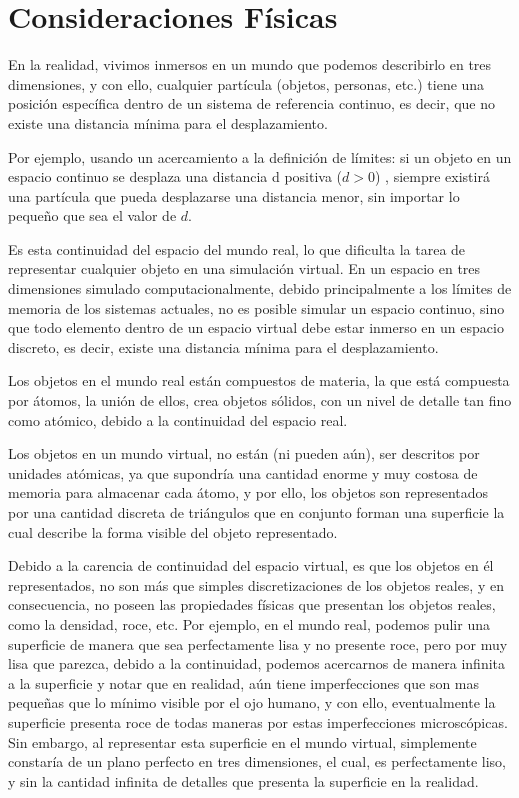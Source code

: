 \section{Consideraciones Físicas}
\label{sec:consideracionesFisicas}
En la realidad, vivimos inmersos en un mundo que podemos describirlo en tres
dimensiones, y con ello, cualquier partícula (objetos, personas, etc.) tiene una posición
específica dentro de un sistema de referencia continuo, es decir, que no existe una distancia
mínima para el desplazamiento.

Por ejemplo, usando un acercamiento a la definición de límites: si un objeto en un espacio
continuo se desplaza una distancia  d  positiva  ($d > 0$) , siempre existirá una partícula que
pueda desplazarse una distancia menor, sin importar lo pequeño que sea el valor de $d$.

Es esta continuidad del espacio del mundo real, lo que dificulta la tarea de representar
cualquier objeto en una simulación virtual.
En un espacio en tres dimensiones simulado computacionalmente, debido principalmente
a los límites de memoria de los sistemas actuales, no es posible simular un espacio continuo, sino
que todo elemento dentro de un espacio virtual debe estar inmerso en un espacio discreto, es
decir, existe una distancia mínima para el desplazamiento.

Los objetos en el mundo real están compuestos de materia, la que está compuesta por
átomos, la unión de ellos, crea objetos sólidos, con un nivel de detalle tan fino como atómico,
debido a la continuidad del espacio real.

Los objetos en un mundo virtual, no están (ni pueden aún), ser descritos por unidades
atómicas, ya que supondría una cantidad enorme y muy costosa de memoria para almacenar cada
átomo, y por ello, los objetos son representados por una cantidad discreta de triángulos que en
conjunto forman una superficie la cual describe la forma visible del objeto representado.

Debido a la carencia de continuidad del espacio virtual, es que los objetos en él representados, no son más que simples discretizaciones de los objetos reales, y en consecuencia, no poseen las
propiedades físicas que presentan los objetos reales, como la densidad, roce, etc.
Por ejemplo, en el mundo real, podemos pulir una superficie de manera que sea
perfectamente lisa y no presente roce, pero por muy lisa que parezca, debido a la continuidad,
podemos acercarnos de manera infinita a la superficie y notar que en realidad, aún tiene
imperfecciones que son mas pequeñas que lo mínimo visible por el ojo humano, y con ello,
eventualmente la superficie presenta roce de todas maneras por estas imperfecciones
microscópicas. Sin embargo, al representar esta superficie en el mundo virtual, simplemente
constaría de un plano perfecto en tres dimensiones, el cual, es perfectamente liso, y sin la
cantidad infinita de detalles que presenta la superficie en la realidad.

